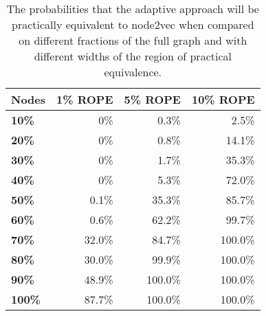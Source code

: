 \begin{table}
  \caption{The probabilities that the adaptive approach will be practically equivalent to node2vec when compared on different fractions of the full graph and with different widths of the region of practical equivalence.}
  \label{tab:bayesian-adaptive}
  \centering
  \begin{tabular}{lrrr}
    \toprule
    \textbf{Nodes} & \textbf{1\% ROPE} & \textbf{5\% ROPE} & \textbf{10\% ROPE} \\
    \midrule
    \textbf{10\%}  & 0\%               & 0.3\%             & 2.5\%              \\
    \textbf{20\%}  & 0\%               & 0.8\%             & 14.1\%             \\
    \textbf{30\%}  & 0\%               & 1.7\%             & 35.3\%             \\
    \textbf{40\%}  & 0\%               & 5.3\%             & 72.0\%             \\
    \textbf{50\%}  & 0.1\%             & 35.3\%            & 85.7\%             \\
    \textbf{60\%}  & 0.6\%             & 62.2\%            & 99.7\%             \\
    \textbf{70\%}  & 32.0\%            & 84.7\%            & 100.0\%            \\
    \textbf{80\%}  & 30.0\%            & 99.9\%            & 100.0\%            \\
    \textbf{90\%}  & 48.9\%            & 100.0\%           & 100.0\%            \\
    \textbf{100\%} & 87.7\%            & 100.0\%           & 100.0\%            \\
    \bottomrule
  \end{tabular}
\end{table}
